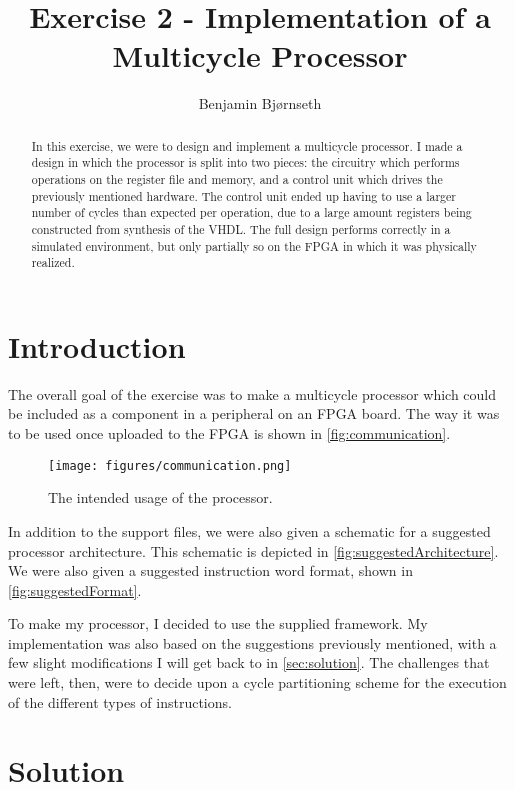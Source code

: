 \documentclass[11pt]{article}
\title{Exercise 2 - Implementation of a Multicycle Processor}
\author{Benjamin Bj\o rnseth}
\begin{document}
\maketitle

\begin{abstract}
  In this exercise, we were to design and implement a multicycle processor. I
  made a design in which the processor is split into two pieces: the circuitry
  which performs operations on the register file and memory, and a control unit
  which drives the previously mentioned hardware. The control unit ended up
  having to use a larger number of cycles than expected per operation, due to a
  large amount registers being constructed from synthesis of the VHDL. The full
  design performs correctly in a simulated environment, but only partially so on
  the FPGA in which it was physically realized.
\end{abstract}

\section{Introduction}
\label{sec:introduction}
The overall goal of the exercise was to make a multicycle processor
which could be included as a component in a peripheral on an FPGA
board. The way it was to be used once uploaded to the FPGA is shown in
\autoref{fig:communication}.

\begin{figure}[ht]
  \centering
  \texttt{[image: figures/communication.png]}
  \caption{\label{fig:communication} The intended usage of the
    processor. }
\end{figure}


In addition to the support files, we were also given a schematic for a
suggested processor architecture. This schematic is depicted in
\autoref{fig:suggestedArchitecture}. We were also given a suggested
instruction word format, shown in \autoref{fig:suggestedFormat}.

To make my processor, I decided to use the supplied framework. My
implementation was also based on the suggestions previously mentioned,
with a few slight modifications I will get back to in
\autoref{sec:solution}. The challenges that were left, then, were to
decide upon a cycle partitioning scheme for the execution of the
different types of instructions. 

\section{Solution}
\label{sec:solution}
\end{document}
